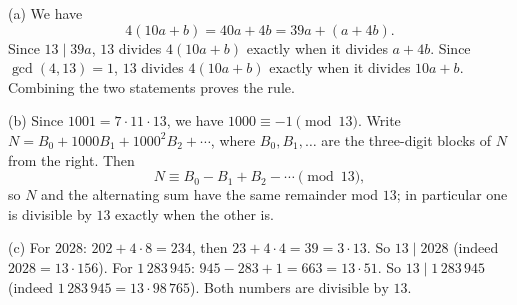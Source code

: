 (a) We have
\[
4(10a+b)=40a+4b=39a+(a+4b).
\]
Since $13\mid39a$, $13$ divides $4(10a+b)$ exactly when it divides $a+4b$. Since $\gcd(4,13)=1$, $13$ divides $4(10a+b)$ exactly when it divides $10a+b$. Combining the two statements proves the rule.

(b) Since $1001=7\cdot11\cdot13$, we have $1000\equiv-1\pmod{13}$. Write $N=B_0+1000B_1+1000^2B_2+\cdots$, where $B_0,B_1,\dots$ are the three-digit blocks of $N$ from the right. Then
\[
N\equiv B_0-B_1+B_2-\cdots\pmod{13},
\]
so $N$ and the alternating sum have the same remainder mod $13$; in particular one is divisible by $13$ exactly when the other is.

(c) For $2028$: $202+4\cdot8=234$, then $23+4\cdot4=39=3\cdot13$. So $13\mid2028$ (indeed $2028=13\cdot156$). For $1\,283\,945$: $945-283+1=663=13\cdot51$. So $13\mid1\,283\,945$ (indeed $1\,283\,945=13\cdot98\,765$). Both numbers are $\boxed{\text{divisible by }13}$.
